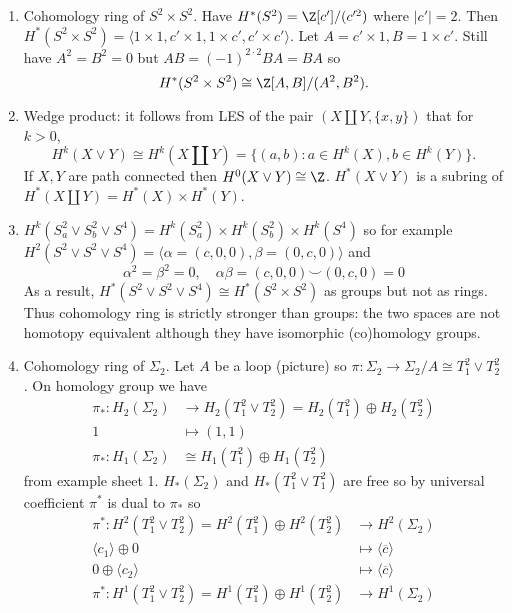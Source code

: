 \documentclass[a4paper]{article}
\newcommand*{\cp}{\smile} %
\begin{document}
\begin{eg}
\begin{enumerate}
  \item Cohomology ring of \(S^2 \times S^2\). Have \(H^*(S^2) = \Z[c']/(c'^2)\) where \(|c'| = 2\). Then \(H^*(S^2 \times S^2) = \langle 1 \times 1, c' \times 1, 1 \times c', c' \times c' \rangle\). Let \(A = c' \times 1, B = 1 \times c'\). Still have \(A^2 = B^2 = 0\) but \(AB = (-1)^{2 \cdot 2} BA = BA\) so
    \[
      H^*(S^2 \times S^2) \cong \Z[A, B]/(A^2, B^2).
    \]
  \item Wedge product: it follows from LES of the pair \((X \amalg Y, \{x, y\})\) that for \(k > 0\),
    \[
      H^k(X \vee Y) \cong H^k(X \amalg Y) = \{(a, b): a \in H^k(X), b \in H^k(Y)\}.
    \]
    If \(X, Y\) are path connected then \(H^0(X \vee Y) \cong \Z\). \(H^*(X \vee Y)\) is a subring of \(H^*(X \amalg Y) = H^*(X) \times H^*(Y)\).
  \item \(H^k(S^2_a \vee S^2_b \vee S^4) = H^k(S^2_a) \times H^k(S^2_b) \times H^k(S^4)\) so for example \(H^2(S^2 \vee S^2 \vee S^4) = \langle \alpha = (c, 0, 0), \beta = (0, c, 0) \rangle\) and
    \[
      \alpha^2 = \beta^2 = 0, \quad \alpha\beta = (c, 0, 0) \cp (0, c, 0) = 0
    \]
    As a result, \(H^*(S^2 \vee S^2 \vee S^4) \cong H^*(S^2 \times S^2)\) as groups but not as rings. Thus cohomology ring is strictly stronger than groups: the two spaces are not homotopy equivalent although they have isomorphic (co)homology groups.
  \item Cohomology ring of \(\Sigma_2\). Let \(A\) be a loop (picture) so \(\pi: \Sigma_2 \to \Sigma_2/A \cong T_1^2 \vee T_2^2\). On homology group we have
    \begin{align*}
      \pi_*: H_2(\Sigma_2) &\to H_2(T_1^2 \vee T_2^2) = H_2(T_1^2) \oplus H_2(T_2^2) \\
      1 &\mapsto (1, 1) \\
      \pi_*: H_1(\Sigma_2) &\cong H_1(T_1^2) \oplus H_1(T_2^2)
    \end{align*}
    from example sheet 1. \(H_*(\Sigma_2)\) and \(H_*(T_1^2 \vee T_1^2)\) are free so by universal coefficient \(\pi^*\) is dual to \(\pi_*\) so
    \begin{align*}
      \pi^*: H^2(T_1^2 \vee T_2^2) = H^2(T_1^2) \oplus H^2(T_2^2) &\to H^2(\Sigma_2) \\
      \langle c_1\rangle \oplus 0 &\mapsto \langle \overline c \rangle \\
      0 \oplus \langle c_2 \rangle &\mapsto \langle \overline c \rangle \\
      \pi^*: H^1(T_1^2 \vee T_2^2) = H^1(T_1^2) \oplus H^1(T_2^2) &\to H^1(\Sigma_2) \\

\end{align*}
\end{enumerate}
\end{eg}
\end{document}
